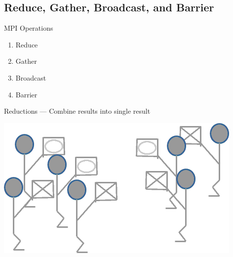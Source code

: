 \subsection{Reduce, Gather, Broadcast, and Barrier}


\begin{frame}
  \begin{block}{MPI Operations}
    \begin{enumerate}
      \item Reduce
      \item Gather
      \item Broadcast
      \item Barrier
    \end{enumerate}
  \end{block}
\end{frame}

\begin{frame}
  \begin{block}{Reductions --- Combine results into single result}
    \begin{center}
      \includegraphics[scale=.6]{../common/pics/mpiops/mpi_reduce}
    \end{center}
  \end{block}
\end{frame}


